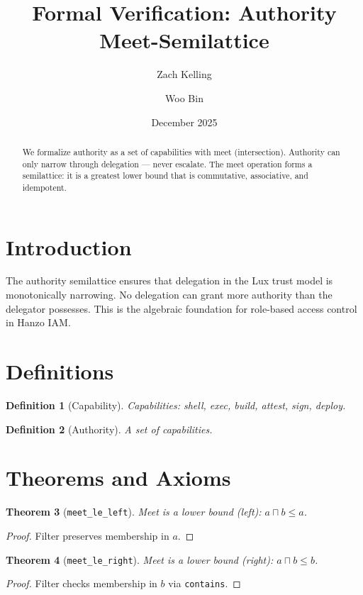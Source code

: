 \documentclass[11pt]{article}
\title{Formal Verification: Authority Meet-Semilattice}
\author{Zach Kelling \and Woo Bin}
\date{December 2025}
\newtheorem{theorem}{Theorem}
\newtheorem{definition}[theorem]{Definition}
\begin{document}
\maketitle

\begin{abstract}
We formalize authority as a set of capabilities with meet (intersection). Authority can only narrow through delegation --- never escalate. The meet operation forms a semilattice: it is a greatest lower bound that is commutative, associative, and idempotent.
\end{abstract}

\section{Introduction}
The authority semilattice ensures that delegation in the Lux trust model is monotonically narrowing. No delegation can grant more authority than the delegator possesses. This is the algebraic foundation for role-based access control in Hanzo IAM.

\section{Definitions}
\begin{definition}[Capability]
Capabilities: shell, exec, build, attest, sign, deploy.
\end{definition}

\begin{definition}[Authority]
A set of capabilities.
\end{definition}


\section{Theorems and Axioms}
\begin{theorem}[\texttt{meet\_le\_left}]
Meet is a lower bound (left): $a \sqcap b \leq a$.
\end{theorem}
\begin{proof}
Filter preserves membership in $a$.
\end{proof}

\begin{theorem}[\texttt{meet\_le\_right}]
Meet is a lower bound (right): $a \sqcap b \leq b$.
\end{theorem}
\begin{proof}
Filter checks membership in $b$ via \texttt{contains}.
\end{proof}
\end{document}
